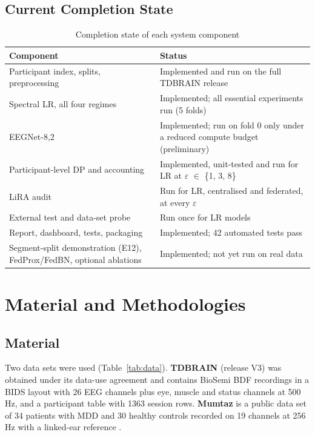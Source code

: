 \documentclass[12pt,a4paper,oneside]{report}
\begin{document}
\section{Current Completion State}
\begin{table}[!htbp]\centering\small{}
\caption{Completion state of each system component}\label{tab:status}
\begin{tabularx}{\textwidth}{lX}
\toprule
Component & Status\\
\midrule
Participant index, splits, preprocessing & Implemented and run on the full TDBRAIN release\\
Spectral LR, all four regimes & Implemented; all essential experiments run (5 folds)\\
EEGNet-8,2 & Implemented; run on fold 0 only under a reduced compute budget (preliminary)\\
Participant-level DP and accounting & Implemented, unit-tested and run for LR at $\varepsilon$ $\in$ \{1, 3, 8\}\\
LiRA audit & Run for LR, centralised and federated, at every $\varepsilon$\\
External test and data-set probe & Run once for LR models\\
Report, dashboard, tests, packaging & Implemented; 42 automated tests pass\\
Segment-split demonstration (E12), FedProx/FedBN, optional ablations & Implemented; not yet run on real data\\
\bottomrule
\end{tabularx}
\end{table}

\chapter{Material and Methodologies}

\section{Material}
Two data sets were used (Table~\ref{tab:data}). \textbf{TDBRAIN} (release V3) was obtained under its data-use agreement and contains BioSemi BDF recordings in a BIDS layout with 26 EEG channels plus eye, muscle and status channels at 500 Hz, and a participant table with 1363 session rows. \textbf{Mumtaz} is a public data set of 34 patients with MDD and 30 healthy controls recorded on 19 channels at 256 Hz with a linked-ear reference \cite{mumtazdata}.
\end{document}
